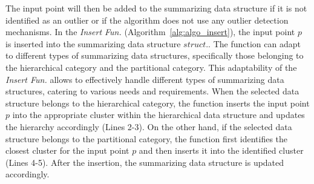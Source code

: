 \begin{algorithm}[t]
\scriptsize
\caption{Outlier Fun. of \algo.}
\label{alg:algo_outlier}
\end{algorithm}

The input point will then be added to the summarizing data structure if it is not identified as an outlier or if the algorithm does not use any outlier detection mechanisms.
In the \emph{Insert Fun.} (Algorithm~\ref{alg:algo_insert}), the input point $p$ is inserted into the summarizing data structure $struct.$. The function can adapt to different types of summarizing data structures, specifically those belonging to the hierarchical category and the partitional category. This adaptability of the \emph{Insert Fun.} allows \algo to effectively handle different types of summarizing data structures, catering to various needs and requirements. When the selected data structure belongs to the hierarchical category, the function inserts the input point $p$ into the appropriate cluster within the hierarchical data structure and updates the hierarchy accordingly (Lines 2-3). On the other hand, if the selected data structure belongs to the partitional category, the function first identifies the closest cluster for the input point $p$ and then inserts it into the identified cluster (Lines 4-5). After the insertion, the summarizing data structure is updated accordingly. 

